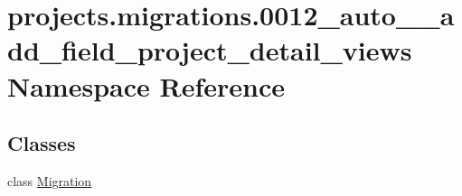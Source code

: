 \hypertarget{namespaceprojects_1_1migrations_1_10012__auto____add__field__project__detail__views}{\section{projects.\-migrations.0012\-\_\-auto\-\_\-\-\_\-add\-\_\-field\-\_\-project\-\_\-detail\-\_\-views Namespace Reference}
\label{namespaceprojects_1_1migrations_1_10012__auto____add__field__project__detail__views}
}
\subsection*{Classes}
\begin{DoxyCompactItemize}
\item 
class \hyperlink{classprojects_1_1migrations_1_10012__auto____add__field__project__detail__views_1_1_migration}{Migration}
\end{DoxyCompactItemize}
